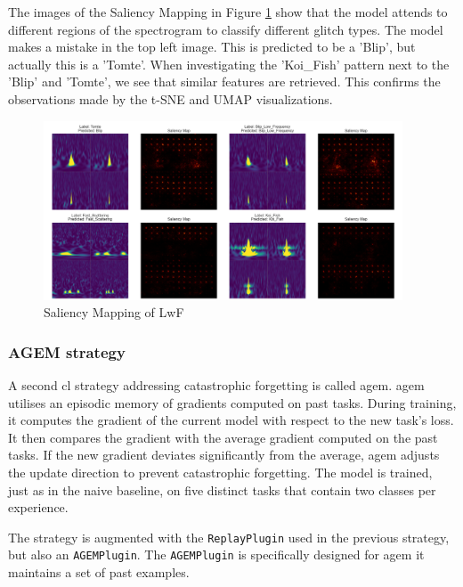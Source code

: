 The images of the Saliency Mapping in Figure \ref{fig:saliency_lwf} show that the model attends to different regions of the spectrogram to classify different glitch types. The model makes a mistake in the top left image. This is predicted to be a 'Blip', but actually this is a 'Tomte'. 
When investigating the 'Koi\_Fish' pattern next to the 'Blip' and 'Tomte', we see that similar features are retrieved. This confirms the observations made by the t-SNE and UMAP visualizations. 

\begin{figure}[ht]
    \centering
    \includegraphics[width=0.95\textwidth]{Images/SaliencyMapping_LwF_MultiView_100epochs_selection.png}
    \caption{Saliency Mapping of LwF}
    \label{fig:saliency_lwf}
\end{figure}

\newpage

\subsubsection{AGEM strategy}
\label{subsubsec:RQ1_AGEM}
A second \acrshort{cl} strategy addressing catastrophic forgetting is called \acrfull{agem}. \acrshort{agem} utilises an episodic memory of gradients computed on past tasks. During training, it computes the gradient of the current model with respect to the new task's loss. It then compares the gradient with the average gradient computed on the past tasks. If the new gradient deviates significantly from the average, \acrshort{agem} adjusts the update direction to prevent catastrophic forgetting. The model is trained, just as in the naive baseline, on five distinct tasks that contain two classes per experience. 

The strategy is augmented with the \verb|ReplayPlugin| used in the previous strategy, but also an \verb|AGEMPlugin|. The \verb|AGEMPlugin| is specifically designed for \acrshort{agem} it maintains a set of past examples. 

